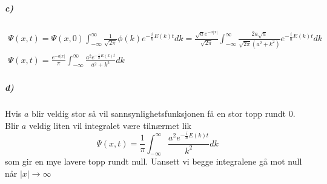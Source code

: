\documentclass[11pt, A4paper,norsk]{article}
\begin{document}
			\subparagraph{c)}
				\begin{gather*}
\Psi(x, t) = \Psi(x, 0) \int_{- \infty}^{\infty} \frac{1}{\sqrt{2 \pi}} \phi(k) e^{- \frac{i}{\hbar} E(k) t} dk = \frac{\sqrt{a} e^{-a|x|}}{\sqrt{2 \pi}} \int_{- \infty}^{\infty} \frac{2 a \sqrt{a}}{\sqrt{2 \pi} (a^2 + k^2)} e^{- \frac{i}{\hbar} E(k) t} dk \\
\Psi(x, t) = \frac{e^{-a|x|}}{\pi} \int_{- \infty}^{\infty} \frac{a^2 e^{- \frac{i}{\hbar} E(k) t}}{a^2 + k^2} dk
				\end{gather*}
			









			\subparagraph{d)}
				\begin{flushleft}
Hvis $a$ blir veldig stor så vil sannsynlighetsfunksjonen få en stor topp rundt $0$. Blir $a$ veldig liten vil integralet være tilnærmet lik 
$$\Psi(x, t) = \frac{1}{\pi} \int_{- \infty}^{\infty} \frac{a^2 e^{- \frac{i}{\hbar} E(k) t}}{k^2} dk $$
som gir en mye lavere topp rundt null. Uansett vi begge integralene gå mot null når $|x| \rightarrow \infty$
				\end{flushleft}
\end{document}
